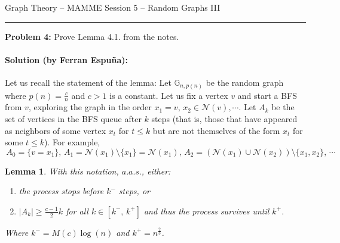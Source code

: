 \documentclass{amsart}
\theoremstyle{plain}
\newtheorem*{lemma}{\textbf{Lemma}}
\theoremstyle{definition}
\begin{document}
    {\Large Graph Theory -- MAMME}
    {\Large Session 5 -- Random Graphs III}

    \vspace{0.5cm}

    \hrule

    \vspace{0.5cm}

    \noindent \textbf{Problem 4:}
    Prove Lemma 4.1. from the notes.


    \paragraph{\textbf{Solution (by Ferran Espuña):}}
    Let us recall the statement of the lemma:
    Let $\mathbb{G}_{n,p(n)}$ be the random graph where $p(n) = \frac{c}{n}$ and $c > 1$ is a constant.
    Let us fix a vertex $v$ and start a BFS from $v$, exploring the graph in the order
    $x_1 = v,\, x_2 \in \mathcal{N}(v), \cdots$.
    Let $A_k$ be the set of vertices in the BFS queue after $k$ steps (that is, those that have appeared
    as neighbors of some vertex $x_t$ for $t \leq k$ but are not themselves of the form $x_t$ for some $t \leq k$).
    For example,$
    \, A_0 = \{ v = x_1 \}, \,
    A_1 = \mathcal{N}(x_1) \setminus \{x_1\} = \mathcal{N}(x_1), \,
    A_2 = (\mathcal{N}(x_1) \cup \mathcal{N}(x_2)) \setminus \{x_1, x_2\}, \, \cdots$

    \begin{lemma}
        With this notation, $a.a.s.$, either:
        \begin{enumerate}
            \item the process stops before $k^-$ steps, or \label{itm:1}
            \item $|A_k| \geq \frac{c - 1}{2}k$ for all $k \in [k^{-}, \, k^{+}]$
            and thus the process survives until $k^{+}$. \label{itm:2}
        \end{enumerate}
        Where $k^{-} = M(c)\log(n)$ and $k^{+} = n^{\frac{2}{3}}$.
    \end{lemma}
\end{document}
